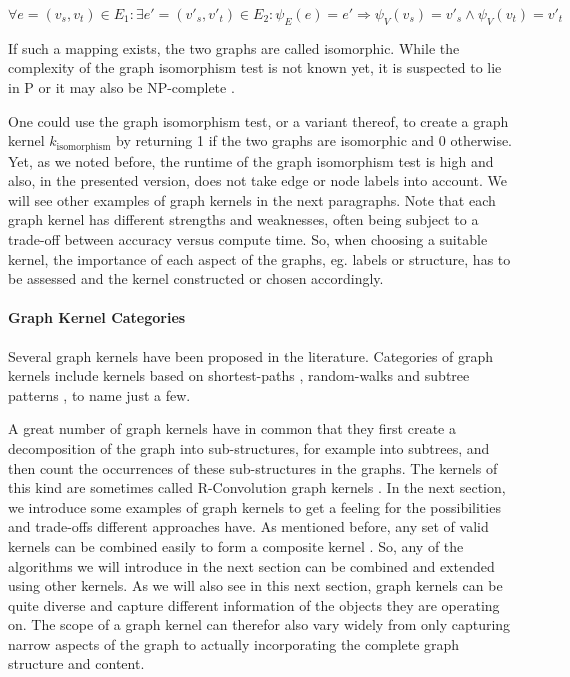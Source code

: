 \begin{equation*}
    \forall e = (v_s, v_t) \in E_1:
    \exists e' = (v'_s, v'_t) \in E_2:
    \psi_{E}(e) = e'
    \Rightarrow
    \psi_{V}(v_s) = v'_s
    \land
    \psi_{V}(v_t) = v'_t
\end{equation*}

If such a mapping exists, the two graphs are called isomorphic.
While the complexity of the graph isomorphism test is not known yet, it is suspected to lie in P or it may also be NP-complete \cite{Hido2009,Kulharia2008}.
 
One could use the graph isomorphism test, or a variant thereof, to create a graph kernel $k_{\textrm{isomorphism}}$ by returning 1 if the two graphs are isomorphic and 0 otherwise.
Yet, as we noted before, the runtime of the graph isomorphism test is high and also, in the presented version, does not take edge or node labels into account.
We will see other examples of graph kernels in the next paragraphs.
Note that each graph kernel has different strengths and weaknesses, often being subject to a trade-off between accuracy versus compute time.
So, when choosing a suitable kernel, the importance of each aspect of the graphs, eg. labels or structure, has to be assessed and the kernel constructed or chosen accordingly.

\paragraph{Graph Kernel Categories}
Several graph kernels have been proposed in the literature.
Categories of graph kernels include kernels based on shortest-paths \cite{Hermansson2015, Borgwardt2005, Nikolentzos2017b}, random-walks \cite{Neuhaus2006a} and subtree patterns \cite{Shervashidze2009,Douglas2011,Kersting2013}, to name just a few.

A great number of graph kernels have in common that they first create a decomposition of the graph into sub-structures, for example into subtrees, and then count the occurrences of these sub-structures in the graphs.
The kernels of this kind are sometimes called R-Convolution graph kernels \cite{Namomsa1965a}.
In the next section, we introduce some examples of graph kernels to get a feeling for the possibilities and trade-offs different approaches have.
As mentioned before, any set of valid kernels can be combined easily to form a composite kernel \cite[p.~296]{Bishop2006}.
So, any of the algorithms we will introduce in the next section can be combined and extended using other kernels.
As we will also see in this next section, graph kernels can be quite diverse and capture different information of the objects they are operating on.
The scope of a graph kernel can therefor also vary widely from only capturing narrow aspects of the graph to actually incorporating the complete graph structure and content.

